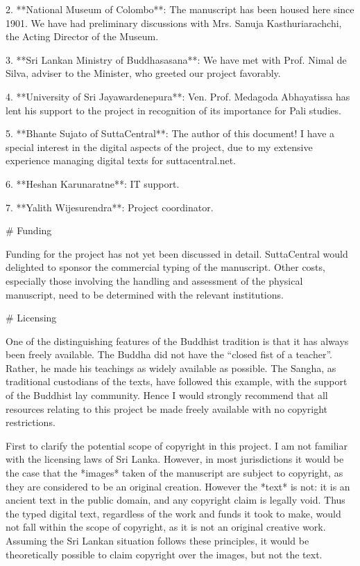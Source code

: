 \documentclass[11pt, openany,a5paper]{article}
\begin{document}
\begin{markdown}
2. **National Museum of Colombo**:  The manuscript has been housed here since 1901. We have had preliminary discussions with Mrs. Sanuja Kasthuriarachchi, the Acting Director of the Museum.

3. **Sri Lankan Ministry of Buddhasasana**:  We have met with Prof. Nimal de Silva, adviser to the Minister, who greeted our project favorably.

4. **University of Sri Jayawardenepura**:  Ven. Prof. Medagoda Abhayatissa has lent his support to the project in recognition of its importance for Pali studies.

5. **Bhante Sujato of SuttaCentral**:  The author of this document! I have a special interest in the digital aspects of the project, due to my extensive experience managing digital texts for suttacentral.net.

6. **Heshan Karunaratne**:  IT support.

7. **Yalith Wijesurendra**:  Project coordinator.

# Funding

Funding for the project has not yet been discussed in detail. SuttaCentral would delighted to sponsor the commercial typing of the manuscript. Other costs, especially those involving the handling and assessment of the physical manuscript, need to be determined with the relevant institutions.

# Licensing

One of the distinguishing features of the Buddhist tradition is that it has always been freely available. The Buddha did not have the “closed fist of a teacher”. Rather, he made his teachings as widely available as possible. The Sangha, as traditional custodians of the texts, have followed this example, with the support of the Buddhist lay community. Hence I would strongly recommend that all resources relating to this project be made freely available with no copyright restrictions.

First to clarify the potential scope of copyright in this project. I am not familiar with the licensing laws of Sri Lanka. However, in most jurisdictions it would be the case that the *images* taken of the manuscript are subject to copyright, as they are considered to be an original creation. However the *text* is not: it is an ancient text in the public domain, and any copyright claim is legally void. Thus the typed digital text, regardless of the work and funds it took to make, would not fall within the scope of copyright, as it is not an original creative work. Assuming the Sri Lankan situation follows these principles, it would be theoretically possible to claim copyright over the images, but not the text.


\end{markdown}
\end{document}
